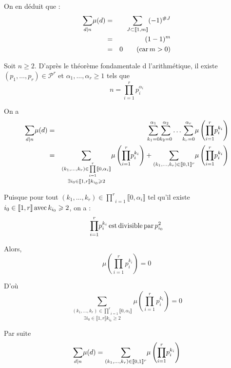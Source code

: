 On en d{\'e}duit que :
\begin{eqnarray*}
  \underset{d |  n}{\sum} \mu (d) & = & \underset{J \subset
  \llbracket 1, m \rrbracket}{\sum} (- 1)^{\#J}\\
  & = & (1 - 1)^m\\
  & = & 0 \qquad (\operatorname{car} m > 0)
\end{eqnarray*}



Soit $n \geqslant 2$. D'apr{\`e}s le th{\'e}or{\`e}me fondamentale d
l'arithm{\'e}tique, il existe $(p_1, \ldots, p_r) \in \mathcal{P}^r$ et
$\alpha_1, \ldots, \alpha_r \geqslant 1$ tels que
\[ n = \underset{i = 1}{\overset{r}{\prod}} p^{\alpha_i}_i \]


On a
\begin{eqnarray*}
  \underset{d |  n}{\sum} \mu (d) & = & \underset{k_1 =
  0}{\overset{\alpha_1}{\sum}} \underset{k_2 = 0}{\overset{\alpha_2}{\sum}}
  \ldots \underset{k_r = 0}{\overset{\alpha_r}{\sum}} \mu \left( \underset{i =
  1}{\overset{r}{\prod}} p^{k_i}_i \right)\\
  & = & \underset{\exists i_0 \in \llbracket 1, r \rrbracket k_{i_0}
  \geqslant 2}{\underset{(k_1, \ldots, k_r) \in \underset{i =
  1}{\overset{r}{\prod}} \llbracket 0, \alpha_i \rrbracket}{\overset{}{\sum}}}
  \mu \left( \underset{i = 1}{\overset{r}{\prod}} p^{k_i}_i \right) +
  \underset{}{\underset{(k_1, \ldots, k_r) \in \llbracket 0, 1
  \rrbracket^r}{\overset{}{\sum}}} \mu \left( \underset{i =
  1}{\overset{r}{\prod}} p^{k_i}_i \right)
\end{eqnarray*}


Puisque pour tout $(k_1, \ldots, k_r) \in \underset{i = 1}{\overset{r}{\prod}}
\llbracket 0, \alpha_i \rrbracket$ tel qu'il existe $i_0 \in \llbracket 1, r
\rrbracket \operatorname{avec} k_{i_0} \geqslant 2$, on a :
\[ \underset{i = 1}{\overset{r}{\prod}} p^{k_i}_i \operatorname{est} \operatorname{divisible}
   \operatorname{par} p^2_{i_0 } \]


Alors,
\[ \mu \left( \underset{i = 1}{\overset{r}{\prod}} p^{k_i}_i \right) = 0 \]


D'o{\`u}
\[ \underset{\exists i_0 \in \llbracket 1, r \rrbracket k_{i_0} \geqslant
   2}{\underset{(k_1, \ldots, k_r) \in \underset{i = 1}{\overset{r}{\prod}}
   \llbracket 0, \alpha_i \rrbracket}{\overset{}{\sum}}} \mu \left(
   \underset{i = 1}{\overset{r}{\prod}} p^{k_i}_i \right) = 0 \]


Par suite
\[ \underset{d |  n}{\sum} \mu (d) = \underset{}{\underset{(k_1,
   \ldots, k_r) \in \llbracket 0, 1 \rrbracket^r}{\overset{}{\sum}}} \mu
   \left( \underset{i = 1}{\overset{r}{\prod}} p^{k_i}_i \right) \]


